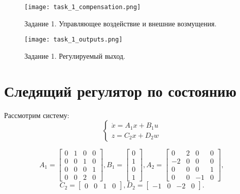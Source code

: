 \begin{figure}[]
    \centering
    \texttt{[image: task\_1\_compensation.png]}
    \caption{\label{fig:task4_3_2}Задание 1. Управляющее воздействие и внешние возмущения.}
\end{figure}

\begin{figure}[]
    \centering
    \texttt{[image: task\_1\_outputs.png]}
    \caption{\label{fig:task4_3_2}Задание 1. Регулируемый выход.}
\end{figure}

\pagebreak

\section{Следящий регулятор по состоянию}

Рассмотрим систему:
\begin{equation}
    \begin{cases}
        \dot{x} = A_1x + B_1u \\
        z = C_2x + D_2w
    \end{cases}
\end{equation}

\begin{equation*}
    A_1 = \begin{bmatrix}
        0 & 1 & 0 & 0 \\
        0 & 0 & 1 & 0 \\
        0 & 0 & 0 & 1 \\
        0 & 0 & 2 & 0
    \end{bmatrix}, 
    B_1 = \begin{bmatrix}
        0 \\ 1 \\ 0 \\ 1
    \end{bmatrix},
    A_2 = \begin{bmatrix}
        0 & 2 & 0 & 0 \\
        -2 & 0 & 0 & 0 \\
        0 & 0 & 0 & 1 \\
        0 & 0 & -1 & 0
    \end{bmatrix}, 
\end{equation*}
\begin{equation*}
    C_2 = \begin{bmatrix}
        0 & 0 & 1 & 0
    \end{bmatrix},
    D_2 = \begin{bmatrix}
        -1 & 0 & -2 & 0
    \end{bmatrix}.
\end{equation*}


